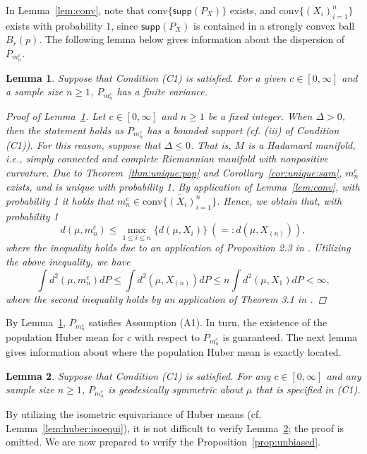 \documentclass[preprint]{imsart}
\theoremstyle{plain}
\newtheorem{lemma}{Lemma}
\theoremstyle{remark}
\begin{document}
\begin{appendix}
In Lemma~\ref{lem:conv}, note that $\mbox{conv}\{\textsf{supp}(P_{X})\}$ exists, and $\mbox{conv}\{(X_{i})_{i=1}^{n}\}$ exists with probability 1, since $\textsf{supp}(P_{X})$ is contained in a strongly convex ball $B_{r}(p)$. The following lemma below gives information about the dispersion of $P_{m_n^c}$.


\begin{lemma}\label{lem:sample:finite}
Suppose that Condition (C1) is satisfied. For a given $c \in [0, \infty]$ and a sample size $n \ge 1$, $P_{m^{c}_{n}}$ has a finite variance.
\begin{proof}[Proof of Lemma~\ref{lem:sample:finite}]
Let $c \in [0,\infty]$ and $n \ge 1$ be a fixed integer. When $\Delta > 0$, then the statement holds as $P_{m^{c}_{n}}$ has a bounded support (cf. (iii) of Condition (C1)). For this reason, suppose that $\Delta \le 0$. That is, $M$ is a Hadamard manifold, i.e., simply connected and complete Riemannian manifold with nonpositive curvature. Due to Theorem~\ref{thm:unique:pop} and Corollary~\ref{cor:unique:sam}, $m^{c}_{n}$ exists, and is unique with probability 1. By application of Lemma~\ref{lem:conv}, with probability 1 it holds that $m^{c}_{n} \in \overline{\mbox{conv}\{(X_{i})_{i=1}^{n}\}}$. Hence, we obtain that, with probability 1 
$$
d(\mu, m^{c}_{n}) \le \max_{1 \le i \le n} \{d(\mu, X_{i})\} ~ (=: d(\mu, X_{(n)})),
$$
where the inequality holds due to an application of Proposition 2.3 in \cite{sturm2003probability}. Utilizing the above inequality, we have 
$$
\int d^2(\mu, m^{c}_{n}) dP \le \int d^2(\mu, X_{(n)})dP \le n \int d^2(\mu, X_{1})dP < \infty,
$$
where the second inequality holds by an application of Theorem 3.1 in \cite{papadatos1995maximum}.
\end{proof}
\end{lemma}

By Lemma~\ref{lem:sample:finite}, $P_{m^{c}_{n}}$ satisfies Assumption (A1). In turn, the existence of the population Huber mean for $c$ with respect to $P_{m^{c}_{n}}$ is guaranteed. The next lemma gives information about where the population Huber mean is exactly located.


\begin{lemma}\label{lem:geo:symm}
Suppose that Condition (C1) is satisfied. For any $c \in [0, \infty]$ and any sample size $n \ge 1$, $P_{m^{c}_{n}}$ is geodesically symmetric about $\mu$ that is specified in (C1).
\end{lemma}
By utilizing the isometric equivariance of Huber means (cf. Lemma~\ref{lem:huber:isoequi}), it is not difficult to verify Lemma~\ref{lem:geo:symm}; the proof is omitted. %
We are now prepared to verify the Proposition~\ref{prop:unbiased}. 




\end{appendix}
\end{document}
